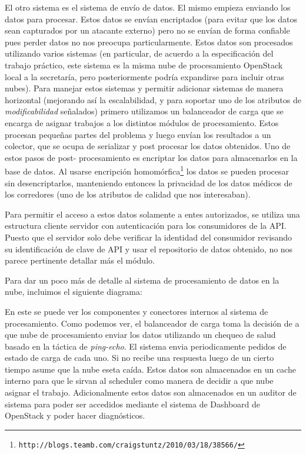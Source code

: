 El otro sistema es el sistema de envío de datos. El mismo empieza enviando
los datos para procesar. Estos datos se envían encriptados (para evitar que
los datos sean capturados por un atacante externo) pero no se envían de forma
confiable pues perder datos no nos preocupa particularmente. Estos datos
son procesados utilizando varios sistemas (en particular, de acuerdo a la
especificación del trabajo práctico, este sistema es la misma nube de 
procesamiento OpenStack local a la secretaría, pero posteriormente podría
expandirse para incluir otras nubes). Para manejar estos sistemas y permitir
adicionar sistemas de manera horizontal (mejorando así la escalabilidad, y
para soportar uno de los atributos de \textit{modificabilidad} señalados)
primero utilizamos un balanceador de carga que se encarga de asignar trabajos
a los distintos módulos de procesamiento. Estos procesan pequeñas partes
del problema y luego envían los resultados a un colector, que se ocupa de
serializar y post procesar los datos obtenidos. Uno de estos pasos de post-
procesamiento es encriptar los datos para almacenarlos en la base de datos.
Al usarse encripción homomórfica\footnote{\texttt{http://blogs.teamb.com/craigstuntz/2010/03/18/38566/}} los datos se pueden procesar sin desencriptarlos,
manteniendo entonces la privacidad de los datos médicos de los corredores
(uno de los atributos de calidad que nos interesaban). 

Para permitir el acceso a estos datos solamente a entes autorizados, se 
utiliza una estructura cliente servidor con autenticación para los 
consumidores de la API. Puesto que el servidor solo debe verificar la 
identidad del consumidor revisando su identificación de clave de API y usar
el repositorio de datos obtenido, no nos parece pertinente detallar más el
módulo.

Para dar un poco más de detalle al sistema de procesamiento de datos en
la nube, incluimos el siguiente diagrama:


En este se puede ver los componentes y conectores internos al sistema de
procesamiento. Como podemos ver, el balanceador de carga toma la decisión
de a que nube de procesamiento enviar los datos utilizando un chequeo de
salud basado en la táctica de \textit{ping-echo}. El sistema envia 
periodicamente pedidos de estado de carga de cada uno. Si no recibe una
respuesta luego de un cierto tiempo asume que la nube eseta caída. Estos
datos son almacenados en un cache interno para que le sirvan al scheduler 
como manera de decidir a que nube asignar el trabajo. Adicionalmente estos
datos son almacenados en un auditor de sistema para poder ser accedidos
mediante el sistema de Dashboard de OpenStack y poder hacer diagnósticos.

